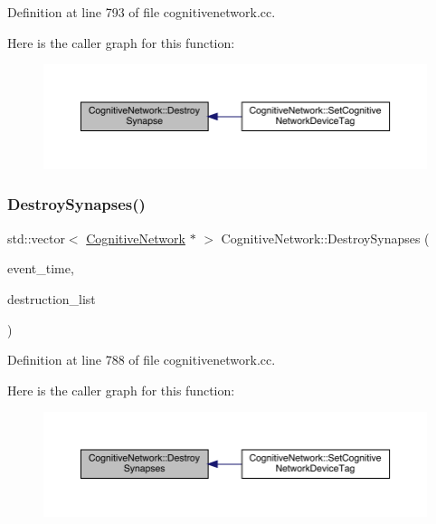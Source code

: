 Definition at line 793 of file cognitivenetwork.\+cc.

Here is the caller graph for this function\+:
\nopagebreak
\begin{figure}[H]
\begin{center}
\leavevmode
\includegraphics[width=350pt]{class_cognitive_network_a08b87aa9a0823355ef7cef77414dc6dc_icgraph}
\end{center}
\end{figure}
\mbox{\label{class_cognitive_network_a141e9e8e6337d42fc19edd75bb50e47b}} 
\subsubsection{\texorpdfstring{Destroy\+Synapses()}{DestroySynapses()}}
{\footnotesize\ttfamily std\+::vector$<$ \hyperlink{class_cognitive_network}{Cognitive\+Network} $\ast$ $>$ Cognitive\+Network\+::\+Destroy\+Synapses (\begin{DoxyParamCaption}\item[{std\+::chrono\+::time\+\_\+point$<$ \hyperlink{universe_8h_a0ef8d951d1ca5ab3cfaf7ab4c7a6fd80}{Clock} $>$}]{event\+\_\+time,  }\item[{std\+::vector$<$ \hyperlink{class_cognitive_network}{Cognitive\+Network} $\ast$$>$}]{destruction\+\_\+list }\end{DoxyParamCaption})}



Definition at line 788 of file cognitivenetwork.\+cc.

Here is the caller graph for this function\+:
\nopagebreak
\begin{figure}[H]
\begin{center}
\leavevmode
\includegraphics[width=350pt]{class_cognitive_network_a141e9e8e6337d42fc19edd75bb50e47b_icgraph}
\end{center}
\end{figure}
\mbox{\label{class_cognitive_network_a6bb3fc06029c260dd658d0db072625a7}} 
